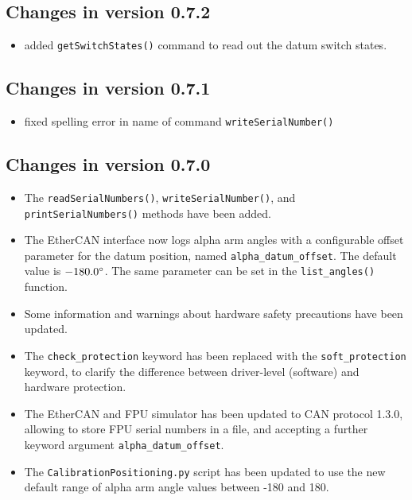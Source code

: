 \documentclass[11pt,a4paper]{scrartcl}
\begin{document}
\subsection*{Changes in version 0.7.2}
\begin{itemize}
\item added \texttt{getSwitchStates()} command to read out
  the datum switch states.  
\end{itemize}


\subsection*{Changes in version 0.7.1}
\begin{itemize}
\item fixed spelling error in name of command \texttt{writeSerialNumber()}
  
\end{itemize}
\subsection*{Changes in version 0.7.0}
\begin{itemize}
\item The \texttt{readSerialNumbers()}, \texttt{writeSerialNumber()},
  and \texttt{printSerialNumbers()} methods have been added.
  
\item The EtherCAN interface now logs alpha arm angles with a configurable offset
  parameter for the datum position, named
  \texttt{alpha\_datum\_offset}. The default value is
  $-180.0\degree$.  The same parameter can be set in the
  \texttt{list\_angles()} function.
  
\item Some information and warnings about hardware safety precautions
  have been updated.
  
\item The \texttt{check\_protection} keyword has been replaced
  with the \texttt{soft\_protection} keyword, to clarify
  the difference between driver-level (software) and
  hardware protection.
  
\item The EtherCAN and FPU simulator has been updated to CAN protocol
  1.3.0, allowing to store FPU serial numbers in a file, and accepting
  a further keyword argument \texttt{alpha\_datum\_offset}.
  
\item The \texttt{CalibrationPositioning.py} script has been updated
  to use the new default range of alpha arm angle values between -180 and 180.
\end{itemize}
\end{document}
